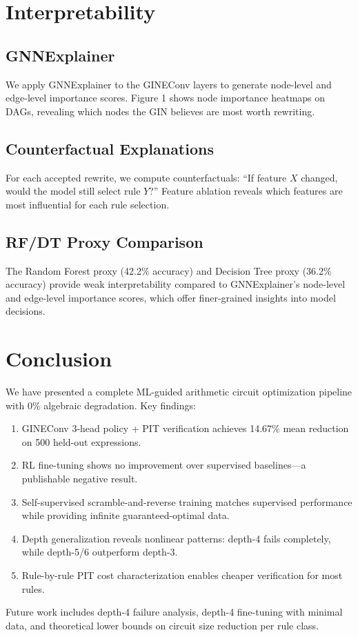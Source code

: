 \documentclass[10pt]{article}
\begin{document}
\section{Interpretability}

\subsection{GNNExplainer}

We apply GNNExplainer to the GINEConv layers to generate node-level and
edge-level importance scores. Figure 1 shows node importance heatmaps on DAGs,
revealing which nodes the GIN believes are most worth rewriting.

\subsection{Counterfactual Explanations}

For each accepted rewrite, we compute counterfactuals: ``If feature $X$ changed,
would the model still select rule $Y$?'' Feature ablation reveals which
features are most influential for each rule selection.

\subsection{RF/DT Proxy Comparison}

The Random Forest proxy (42.2\% accuracy) and Decision Tree proxy (36.2\%
accuracy) provide weak interpretability compared to GNNExplainer's node-level
and edge-level importance scores, which offer finer-grained insights into model
decisions.

\section{Conclusion}

We have presented a complete ML-guided arithmetic circuit optimization pipeline
with 0\% algebraic degradation. Key findings:

\begin{enumerate}
    \item GINEConv 3-head policy + PIT verification achieves 14.67\% mean
          reduction on 500 held-out expressions.
    \item RL fine-tuning shows no improvement over supervised baselines—a
          publishable negative result.
    \item Self-supervised scramble-and-reverse training matches supervised
          performance while providing infinite guaranteed-optimal data.
    \item Depth generalization reveals nonlinear patterns: depth-4 fails
          completely, while depth-5/6 outperform depth-3.
    \item Rule-by-rule PIT cost characterization enables cheaper verification
          for most rules.
\end{enumerate}

Future work includes depth-4 failure analysis, depth-4 fine-tuning with minimal
data, and theoretical lower bounds on circuit size reduction per rule class.



\end{document}
